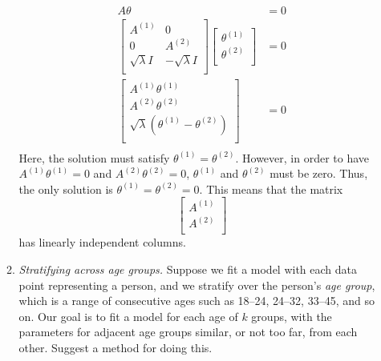 \begin{enumerate}[label=(\alph*)]
\begin{enumerate}[label=(\alph*)]
\begin{tcolorbox}
			            $$ \begin{aligned}
					            A \theta                                       & = 0 \\
					            \begin{bmatrix}
						            A^{(1)}          & 0                 \\
						            0                & A^{(2)}           \\
						            \sqrt{\lambda} I & -\sqrt{\lambda} I \\
					            \end{bmatrix}
					            \begin{bmatrix}
						            \theta^{(1)} \\
						            \theta^{(2)} \\
					            \end{bmatrix}                                & = 0   \\
					            \begin{bmatrix}
						            A^{(1)} \theta^{(1)} \\
						            A^{(2)} \theta^{(2)} \\
						            \sqrt{\lambda} \left( \theta^{(1)} -
						            \theta^{(2)}\right)  \\
					            \end{bmatrix} & = 0        \\
				            \end{aligned} $$
			            Here, the solution must satisfy $\theta^{(1)} =
				            \theta^{(2)}$. However, in order to have $A^{(1)}
				            \theta^{(1)} = 0$ and $A^{(2)} \theta^{(2)} = 0$,
			            $\theta^{(1)}$ and $\theta^{(2)}$ must be zero. Thus,
			            the only solution is $\theta^{(1)} = \theta^{(2)} =
				            0$. This means that the matrix
			            $$ \begin{bmatrix}
					            A^{(1)} \\
					            A^{(2)} \\
				            \end{bmatrix} $$
			            has linearly independent columns.
		            \end{tcolorbox}
		      \item \textit{Stratifying across age groups.} Suppose we fit a
		            model with each data point representing a person, and we
		            stratify over the person’s \textit{age group}, which is a
		            range of consecutive ages such as 18–24, 24–32, 33–45, and
		            so on. Our goal is to fit a model for each age of $k$
		            groups, with the parameters for adjacent age groups similar,
		            or not too far, from each other. Suggest a method for doing
		            this.


\end{enumerate}
\end{enumerate}
